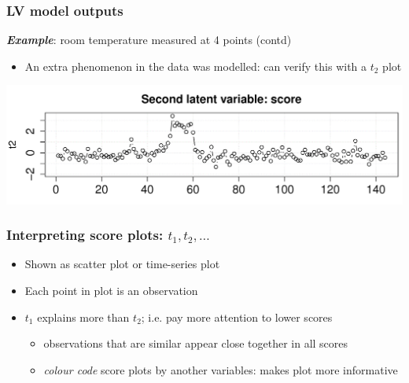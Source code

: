\begin{frame}\frametitle{LV model outputs}

	\textbf{\emph{Example}}: room temperature measured at 4 points (contd)
	
	\begin{itemize}
		\item	An extra phenomenon in the data was modelled: can verify this with a \( t_2 \) plot
	\end{itemize}

	\begin{center}
		\includegraphics[width=\textwidth]{images/temperatures-LV-2-scores.png}
	\end{center}
\end{frame}

\begin{frame}\frametitle{Interpreting score plots: \(t_1, t_2, \ldots \)}

\begin{itemize}
	\item	Shown as scatter plot or time-series plot

	\item	Each point in plot is an observation

	\item	\(t_1\) explains more than \(t_2\); i.e. pay more attention to lower scores

		\begin{itemize}
			\item	observations that are similar appear close together in all scores
			\item	\emph{colour code} score plots by another variables: makes plot more informative
		\end{itemize}

\end{itemize}
\end{frame}

